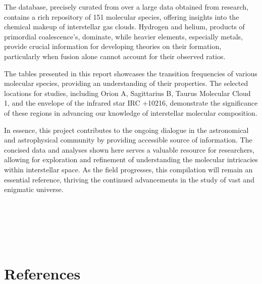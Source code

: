 \documentclass{article}
\begin{document}
The database, precisely curated from over a large data obtained from research, contains a rich repository of 151 molecular species, offering insights into the chemical makeup of interstellar gas clouds. Hydrogen and helium, products of primordial coalescence's, dominate, while heavier elements, especially metals, provide crucial information for developing theories on their formation, particularly when fusion alone cannot account for their observed ratios.

The tables presented in this report showcases the transition frequencies of various molecular species, providing an understanding of their properties. The selected locations for studies, including Orion A, Sagittarius B, Taurus Molecular Cloud 1, and the envelope of the infrared star IRC +10216, demonstrate the significance of these regions in advancing our knowledge of interstellar molecular composition.

In essence, this project contributes to the ongoing dialogue in the astronomical and astrophysical community by providing accessible source of information. The concised data and analyses shown here serves a valuable resource for researchers, allowing for exploration and refinement of understanding the molecular intricacies within interstellar space. As the field progresses, this compilation will remain an essential reference, thriving the continued advancements in the study of vast and enigmatic universe.
\\ \\ \\ \\ \\ \\ 


\section{References}
\end{document}
